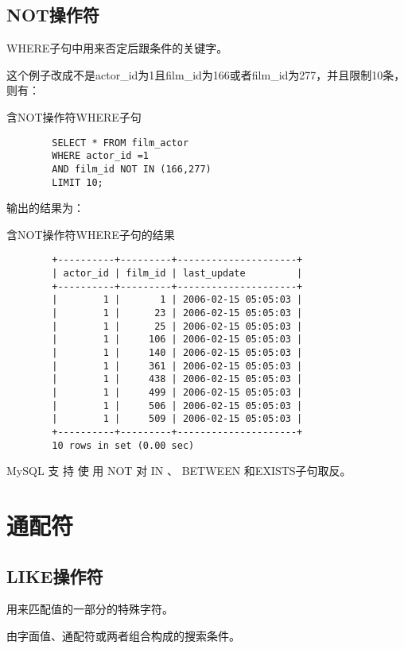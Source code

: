 \documentclass[UTF8]{article}
\begin{document}
\subsection{NOT操作符}
\begin{redbox}[frametitle={Defination 7.6 NOT操作符}]
        WHERE子句中用来否定后跟条件的关键字。
\end{redbox}

这个例子改成不是actor\_id为1且film\_id为166或者film\_id为277，并且限制10条，则有：
\begin{listing}[H]
	\caption{含NOT操作符WHERE子句}
	\label{code:notwhereclause}
\begin{verbatim}
        SELECT * FROM film_actor 
        WHERE actor_id =1 
        AND film_id NOT IN (166,277)
        LIMIT 10;
\end{verbatim}
\end{listing}

输出的结果为：

\begin{listing}[H]
	\caption{含NOT操作符WHERE子句的结果}
	\label{code:notwhereclauseresult}
\begin{verbatim}
        +----------+---------+---------------------+
        | actor_id | film_id | last_update         |
        +----------+---------+---------------------+
        |        1 |       1 | 2006-02-15 05:05:03 |
        |        1 |      23 | 2006-02-15 05:05:03 |
        |        1 |      25 | 2006-02-15 05:05:03 |
        |        1 |     106 | 2006-02-15 05:05:03 |
        |        1 |     140 | 2006-02-15 05:05:03 |
        |        1 |     361 | 2006-02-15 05:05:03 |
        |        1 |     438 | 2006-02-15 05:05:03 |
        |        1 |     499 | 2006-02-15 05:05:03 |
        |        1 |     506 | 2006-02-15 05:05:03 |
        |        1 |     509 | 2006-02-15 05:05:03 |
        +----------+---------+---------------------+
        10 rows in set (0.00 sec)
\end{verbatim}
\end{listing}

\begin{orangebox}[frametitle={Tips 7.6}]
        MySQL 支 持 使 用 NOT 对 IN 、 BETWEEN 和EXISTS子句取反。
\end{orangebox}


\section{通配符}
\subsection{LIKE操作符}
\begin{redbox}[frametitle={Defination 8.1 通配符（wildcard）}]
        用来匹配值的一部分的特殊字符。
\end{redbox}
\begin{redbox}[frametitle={Defination 8.1 搜索模式（search pattern）}]
        由字面值、通配符或两者组合构成的搜索条件。
\end{redbox}
\end{document}
